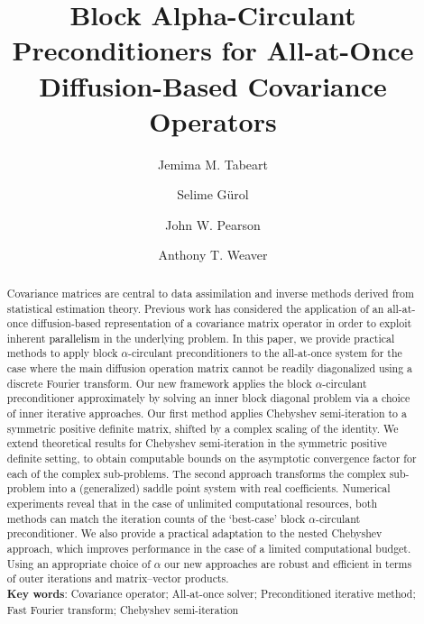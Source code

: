 \documentclass{article}
\newcommand{\jt}{\textcolor{black}}%
\theoremstyle{definition}
\begin{document}
	
	
	
	\title{Block {Alpha-}Circulant Preconditioners for All-at-Once Diffusion-Based 
		Covariance Operators}
	
	
	\author{Jemima M. Tabeart\footnotemark[1] \and Selime G{\"u}rol\footnotemark[2] \and John W. Pearson\footnotemark[3] \and Anthony T. Weaver\footnotemark[2]}
	
	
	
	\date{}
	
	\maketitle
	
	\renewcommand{\thefootnote}{\fnsymbol{footnote}}
	
	\begin{abstract}
		{Covariance matrices are central to data assimilation and inverse methods derived from statistical estimation theory. Previous work has considered the application of an all-at-once diffusion-based representation of a covariance matrix operator in order to exploit inherent \jt{parallelism}  in the underlying problem. In this paper, we provide practical methods to apply block $\alpha$-circulant preconditioners to the all-at-once system for the case where the main diffusion operation matrix cannot be readily diagonalized using a discrete Fourier transform. Our new framework applies the block $\alpha$-circulant preconditioner approximately by solving an inner block diagonal problem via a choice of inner iterative approaches.  Our first method applies Chebyshev semi-iteration to a symmetric positive definite matrix, shifted by a complex scaling of the identity. 
			We extend theoretical results for Chebyshev semi-iteration in the symmetric positive definite setting, to obtain computable bounds on the asymptotic convergence factor for each of the complex sub-problems. The second approach transforms the complex sub-problem into a (generalized) saddle point system with real coefficients.     
			Numerical experiments reveal that in the case of unlimited computational resources, both methods can match the iteration counts of the `best-case' block $\alpha$-circulant preconditioner. We also provide a practical adaptation to the nested Chebyshev approach, which improves performance in the case of a limited computational budget. Using an appropriate choice of $\alpha$ our new approaches are robust and efficient in terms of outer iterations and matrix--vector products. } \\
		\textbf{Key words}: {Covariance operator; All-at-once solver; Preconditioned iterative method; Fast Fourier transform; Chebyshev semi-iteration}
	\end{abstract}
\end{document}
